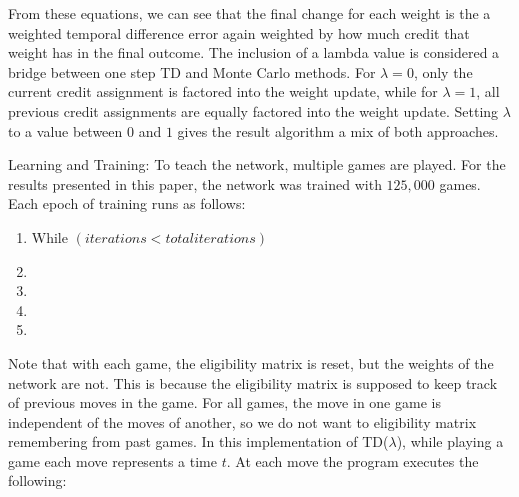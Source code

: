 \documentclass{sig-alternate-05-2015}
\begin{document}
From these equations, we can see that the final change for each weight is the a weighted temporal difference error again weighted by how much credit that weight has in the final outcome. The inclusion of a lambda value is considered a bridge between one step TD and Monte Carlo methods. For $\lambda=0$, only the current credit assignment is factored into the weight update, while for $\lambda=1$, all previous credit assignments are equally factored into the weight update. Setting $\lambda$ to a value between $0$ and $1$ gives the result algorithm a mix of both approaches.

Learning and Training:
To teach the network, multiple games are played. For the results presented in this paper, the network was trained with $125,000$ games. Each epoch of training runs as follows:

\begin{enumerate}
\itemsep0em 
\item While $(iterations < total iterations)$
\item  \hspace*{.5cm}
\item  \hspace*{1cm}
\item  \hspace*{.5cm}
\item   \hspace*{1cm}
\end{enumerate}


Note that with each game, the eligibility matrix is reset, but the weights of the network are not. This is because the eligibility matrix is supposed to keep track of previous moves in the game. For all games, the move in one game is independent of the moves of another, so we do not want to eligibility matrix remembering from past games. In this implementation of TD($\lambda$), while playing a game each move represents a time $t$. At each move the program executes the following:
\end{document}
